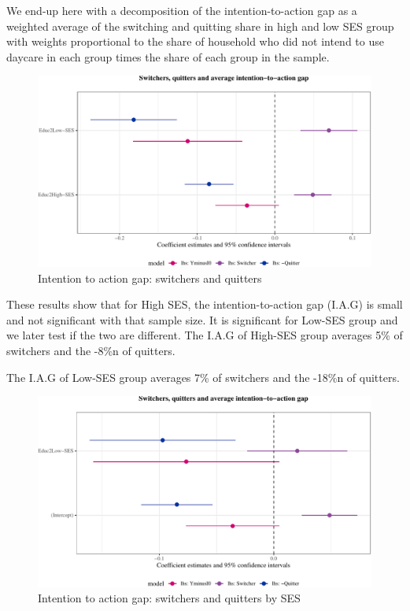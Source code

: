 \documentclass[
]{article}
\theoremstyle{definition}
\theoremstyle{definition}
\theoremstyle{definition}
\theoremstyle{definition}
\theoremstyle{remark}
\begin{document}
We end-up here with a decomposition of the intention-to-action gap as a weighted average of the switching and quitting share in high and low SES group with weights proportional to the share of household who did not intend to use daycare in each group times the share of each group in the sample.

\begin{figure}
\centering
\includegraphics{Theory_files/figure-latex/figQuittersECS-1.pdf}
\caption{\label{fig:figQuittersECS}Intention to action gap: switchers and quitters}
\end{figure}

These results show that for High SES, the intention-to-action gap (I.A.G) is small and not significant with that sample size. It is significant for Low-SES group and we later test if the two are different. The I.A.G of High-SES group averages 5\% of switchers and the -8\%n of quitters.

The I.A.G of Low-SES group averages 7\% of switchers and the -18\%n of quitters.

\begin{figure}
\centering
\includegraphics{Theory_files/figure-latex/figQuitterslin-1.pdf}
\caption{\label{fig:figQuitterslin}Intention to action gap: switchers and quitters by SES}
\end{figure}
\end{document}
